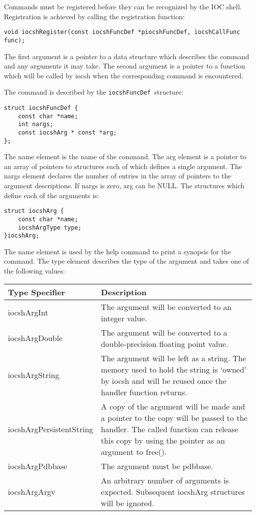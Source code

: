 Commands must be registered before they can be recognized by the IOC shell.
Registration is achieved by calling the registration function:

\begin{verbatim}
void iocshRegister(const iocshFuncDef *piocshFuncDef, iocshCallFunc func);
\end{verbatim}

The first argument is a pointer to a data structure which describes the command and any arguments it may take.
The second argument is a pointer to a function which will be called by iocsh when the corresponding command is encountered.

The command is described by the  \verb|iocshFuncDef |structure:

\begin{verbatim}
struct iocshFuncDef {
    const char *name;
    int nargs;
    const iocshArg * const *arg;
};
\end{verbatim}

The name element is the name of the command.
The arg element is a pointer to an array of pointers to structures each of which defines a single argument.
The nargs element declares the number of entries in the array of pointers to the argument descriptions.
If nargs is zero, arg can be NULL.
The structures which define each of the arguments is:

\begin{verbatim}
struct iocshArg {
    const char *name;
    iocshArgType type;
}iocshArg;
\end{verbatim}

The name element is used by the help command to print a synopsis for the command.
The type element describes the type of the argument and takes one of the following values:

\begin{center}
\begin{longtable}
{p{1.5in}p{3.76in}}
Type Specifier & Description\\
\hline
iocshArgInt & The argument will be converted to an integer value.\\
iocshArgDouble & The argument will be converted to a double-precision floating point value.\\
iocshArgString & The argument will be left as a string.  The memory used to hold the string is `owned' by iocsh and will be reused once the handler function returns.\\
iocshArgPersistentString & A copy of the argument will be made and a pointer to the copy will be passed to the handler.  The called function can release this copy by using the pointer as an argument to free().\\
iocshArgPdbbase & The argument must be pdbbase.\\
iocshArgArgv & An arbitrary number of arguments is expected.  Subsequent iocshArg structures will be ignored.
\end{longtable}
\end{center}



